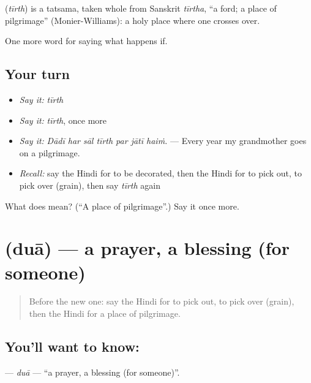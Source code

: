 \begin{cousinweb}
\textbf{} (\emph{tīrth}) is a tatsama, taken whole from Sanskrit \emph{tīrtha}, \textquotedblleft{}a ford; a place of pilgrimage\textquotedblright{} (Monier-Williams): a holy place where one crosses over.
\end{cousinweb}

\begin{grammarlens}[title={What you've built}]
One more word for saying what happens if.
\end{grammarlens}

\subsection*{Your turn}
\begin{itemize}
\raggedright
  \item \emph{Say it:} \emph{tīrth}
  \item \emph{Say it:} \emph{tīrth}, once more
  \item \emph{Say it:} \emph{Dādī har sāl tīrth par jātī haiṁ.} — Every year my grandmother goes on a pilgrimage.
  \item \emph{Recall:} say the Hindi for to be decorated, then the Hindi for to pick out, to pick over (grain), then say \emph{tīrth} again
\end{itemize}

\begin{tcolorbox}[breakable,colback=teal!4,colframe=teal!35!black,title={Before you move on}]
What does  mean? (\textquotedblleft{}A place of pilgrimage\textquotedblright{}.) Say it once more.
\end{tcolorbox}
\section[\texorpdfstring{\hi{दुआ} (duā)}{दुआ (duā)}]{ (duā) — a prayer, a blessing (for someone)}

\label{lesson:HI-C539-dua}



\begin{quote}
Before the new one: say the Hindi for to pick out, to pick over (grain), then the Hindi for a place of pilgrimage.
\end{quote}

\subsection*{You'll want to know: }
\textbf{} — \emph{duā} — \textquotedblleft{}a prayer, a blessing (for someone)\textquotedblright{}.

